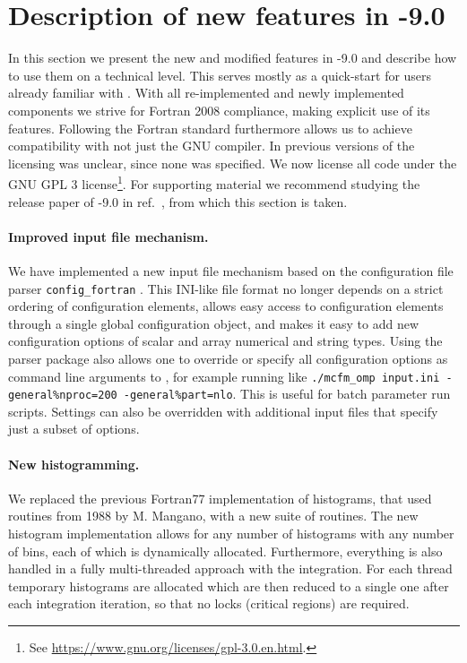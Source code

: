 
\section{Description of new features in \MCFM{}-9.0}
\label{sec:newfeatures-app}

In this section we present the new and modified features in \MCFM{}-9.0 and describe how to use them on a technical 
level. This serves mostly as a quick-start for users already familiar with \MCFM{}. With all re-implemented and newly 
implemented components we strive for Fortran 2008 compliance, making explicit 
use of its features. Following the Fortran standard furthermore allows us to achieve compatibility with not just the 
GNU compiler. In previous versions of \MCFM{} the licensing was unclear, since none was specified. We now license all 
code under the GNU GPL 3 license\footnote{See \url{https://www.gnu.org/licenses/gpl-3.0.en.html}.}. For supporting 
material we recommend studying the release paper of \MCFM{}-9.0 in ref.~\cite{MCFM9}, from which this section is taken.

\paragraph{Improved input file mechanism.}

We have implemented a new input file mechanism based on the configuration file parser \texttt{config\_fortran} 
\cite{JTeunis}.
This INI-like file format no longer depends on a strict ordering of configuration elements, allows easy access to
configuration elements through a single global configuration object, and makes it easy to add new configuration
options of scalar and array numerical and string types. Using the parser package also allows one
to override or specify all configuration options as command line arguments to \MCFM{}, for example running
\MCFM{} like \texttt{./mcfm\_omp input.ini -general\%nproc=200 -general\%part=nlo}. This is useful for batch
parameter run scripts. Settings can also be overridden with additional input files that specify just a subset of 
options.

\paragraph{New histogramming.}

We replaced the previous Fortran77 implementation of histograms, that used routines from 1988 by M. Mangano,
with a new suite of routines.
The new histogram implementation allows for any number of histograms with any number of bins,
each of which is dynamically allocated. Furthermore, everything is also handled in a fully multi-threaded approach with 
the integration. For each \OMP{} thread temporary 
histograms are allocated which are then reduced to a single one after each integration iteration, so that
no \OMP{} locks (critical regions) are required. 

